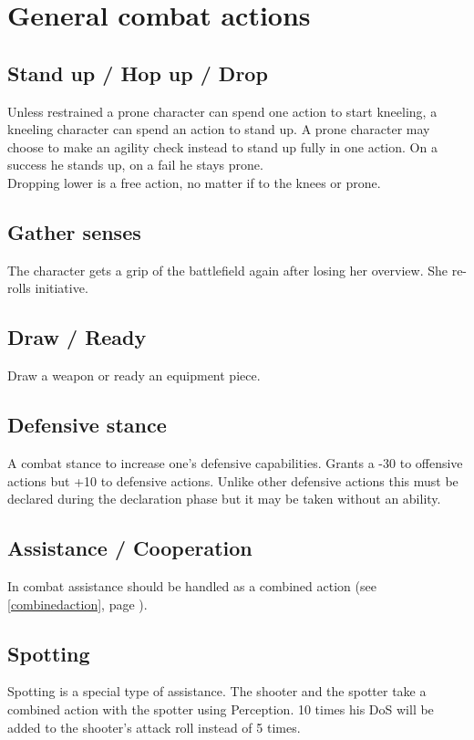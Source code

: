 \newpage
\section{General combat actions}
\subsection*{Stand up / Hop up / Drop}
Unless restrained a prone character can spend one action to start kneeling, a kneeling character can spend an action to stand up. A prone character may choose to make an agility check instead to stand up fully in one action. On a success he stands up, on a fail he stays prone.\\
Dropping lower is a free action, no matter if to the knees or prone.
\subsection*{Gather senses}
The character gets a grip of the battlefield again after losing her overview. She re-rolls initiative.
\subsection*{Draw / Ready}
Draw a weapon or ready an equipment piece.
\subsection*{Defensive stance}
A combat stance to increase one’s defensive capabilities. Grants a -30 to offensive actions but +10 to defensive actions. Unlike other defensive actions this must be declared during the declaration phase but it may be taken without an ability.
\subsection*{Assistance / Cooperation}
In combat assistance should be handled as a combined action (see \ref{combinedaction}, page \pageref{combinedaction}).
\subsection*{Spotting}
Spotting is a special type of assistance. The shooter and the spotter take a combined action with the spotter using Perception. 10 times his DoS will be added to the shooter’s attack roll instead of 5 times.
